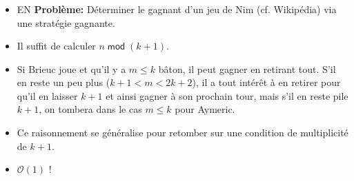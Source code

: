 \begin{frame}
    \frametitle{\problemtitle}
    \begin{itemize}
        \item<+-> EN \textbf{Problème:} Déterminer le gagnant d'un jeu de Nim (cf. Wikipédia) via une stratégie gagnante.
        \item<+-> Il suffit de calculer $n\;\mathsf{mod}\; (k + 1)$.
        \item<+-> Si Brieuc joue et qu'il y a $m \le k$ bâton, il peut gagner en retirant tout. S'il en reste un peu plus ($k+1<m<2k+2$), il a tout intérêt à en retirer pour qu'il en laisser $k+1$ et ainsi gagner à son prochain tour, mais s'il en reste pile $k+1$, on tombera dans le cas $m\le k$ pour Aymeric.
        \item<+-> Ce raisonnement se généralise pour retomber sur une condition de multiplicité de $k+1$.
        \item<+-> $\mathcal O(1)$ !
    \end{itemize}
    \solvestats
\end{frame}

